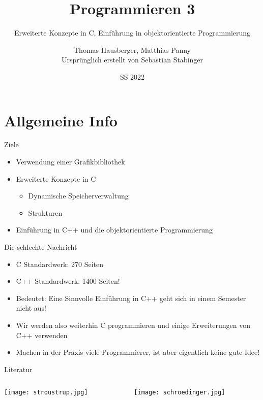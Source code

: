 \documentclass[presentation]{beamer}
\author{Thomas Hausberger, Matthias Panny \\ Ursprünglich erstellt von Sebastian Stabinger}
\date{SS 2022}
\title{Programmieren 3}
\subtitle{Erweiterte Konzepte in C, Einführung in objektorientierte Programmierung}
\begin{document}
\maketitle

\section{Allgemeine Info}
\label{sec:org8f7973f}
\begin{frame}[label={sec:orga855e0f}]{Ziele}
\begin{itemize}
\item Verwendung einer Grafikbibliothek
\item Erweiterte Konzepte in C
\begin{itemize}
\item Dynamische Speicherverwaltung
\item Strukturen
\end{itemize}
\item Einführung in C++ und die objektorientierte Programmierung
\end{itemize}
\begin{block}{Die schlechte Nachricht}
\begin{itemize}
\item C Standardwerk: 270 Seiten
\item C++ Standardwerk: \alert{1400 Seiten!}
\item \alert{Bedeutet:} Eine Sinnvolle Einführung in C++ geht sich in einem
Semester nicht aus!
\item Wir werden also weiterhin C programmieren und einige Erweiterungen
von C++ verwenden
\item Machen in der Praxis viele Programmierer, ist aber \alert{eigentlich keine
gute Idee}!
\end{itemize}
\end{block}
\end{frame}
\begin{frame}[label={sec:orge61127b}]{Literatur}
\begin{columns}
\begin{column}{0.5\columnwidth}
\begin{center}
\texttt{[image: stroustrup.jpg]}
\end{center}
\end{column}
\begin{column}{0.5\columnwidth}
\begin{center}
\texttt{[image: schroedinger.jpg]}
\end{center}
\end{column}
\end{columns}
\end{frame}
\end{document}
